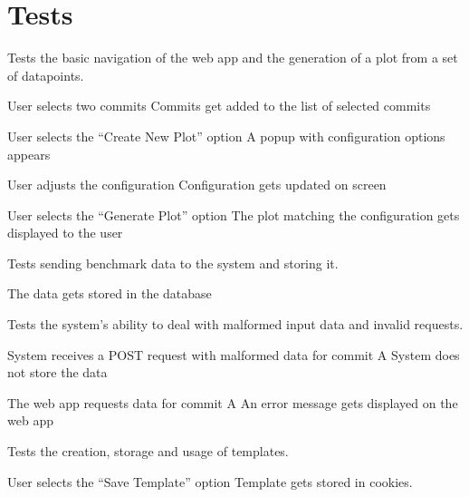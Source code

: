 \section{Tests}


Tests the basic navigation of the web app and the generation of a \gls{plot} from a set of datapoints.

{User selects two commits}
{Commits get added to the list of selected commits}

{User selects the \enquote{Create New Plot} option}
{A popup with configuration options appears}

{User adjusts the configuration}
{Configuration gets updated on screen}

{User selects the \enquote{Generate Plot} option}
{The \gls{plot} matching the configuration gets displayed to the user}


Tests sending benchmark data to the system and storing it.

{The data gets stored in the database}


Tests the system's ability to deal with malformed input data and invalid requests.

{System receives a POST request with malformed data for commit A}
{System does not store the data}

{The web app requests data for commit A}
{An error message gets displayed on the web app}


Tests the creation, storage and usage of templates.

{User selects the \enquote{Save Template} option}
{Template gets stored in cookies.}

